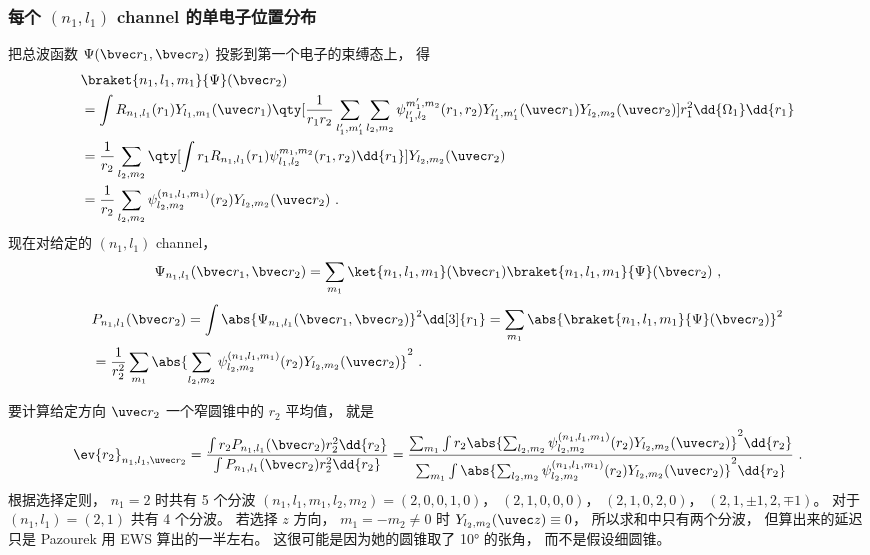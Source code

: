 \subsubsection{每个 $(n_1,l_1)$ channel 的单电子位置分布}
把总波函数 $\Psi(\bvec r_1, \bvec r_2)$ 投影到第一个电子的束缚态上， 得
\begin{equation}
\begin{aligned}
&\braket{n_1,l_1,m_1}{\Psi}(\bvec r_2)\\
&= \int R_{n_1, l_1}(r_1) Y_{l_1, m_1}(\uvec r_1) \qty[\frac{1}{r_1 r_2} \sum_{l_1',m_1'}\sum_{l_2, m_2} \psi_{l'_1,l_2}^{m'_1,m_2}(r_1,r_2) Y_{l'_1,m'_1}(\uvec r_1)Y_{l_2,m_2}(\uvec r_2)] r_1^2\dd{\Omega_1}\dd{r_1}\\
&= \frac{1}{r_2}\sum_{l_2,m_2} \qty[\int r_1 R_{n_1,l_1}(r_1) \psi_{l_1,l_2}^{m_1,m_2}(r_1,r_2) \dd{r_1}] Y_{l_2,m_2}(\uvec r_2)\\
&= \frac{1}{r_2}\sum_{l_2,m_2} \psi_{l_2,m_2}^{(n_1,l_1,m_1)}(r_2) Y_{l_2,m_2}(\uvec r_2)~.
\end{aligned}
\end{equation}
现在对给定的 $(n_1, l_1)$ channel， 
\begin{equation}
\Psi_{n_1,l_1}(\bvec r_1, \bvec r_2) = \sum_{m_1} \ket{n_1,l_1,m_1}(\bvec r_1) \braket{n_1,l_1,m_1}{\Psi}(\bvec r_2)~,
\end{equation}
\begin{equation}
\begin{aligned}
&P_{n_1,l_1}(\bvec r_2) = \int \abs{\Psi_{n_1,l_1}(\bvec r_1, \bvec r_2)}^2 \dd[3]{r_1}
= \sum_{m_1} \abs{\braket{n_1,l_1,m_1}{\Psi}(\bvec r_2)}^2\\
&= \frac{1}{r_2^2} \sum_{m_1} \abs{\sum_{l_2,m_2} \psi_{l_2,m_2}^{(n_1,l_1,m_1)}(r_2) Y_{l_2,m_2}(\uvec r_2)}^2~.
\end{aligned}
\end{equation}

要计算给定方向 $\uvec r_2$ 一个窄圆锥中的 $r_2$ 平均值， 就是
\begin{equation}\label{eq_HeAnal_18}
\ev{r_2}_{n_1,l_1,\uvec r_2} = \frac{\int r_2 P_{n_1,l_1}(\bvec r_2) r_2^2 \dd{r_2}}{\int P_{n_1,l_1}(\bvec r_2) r_2^2 \dd{r_2}}
= \frac{\sum_{m_1} \int r_2\abs{\sum_{l_2,m_2} \psi_{l_2,m_2}^{(n_1,l_1,m_1)}(r_2) Y_{l_2,m_2}(\uvec r_2)}^2 \dd{r_2}}{\sum_{m_1} \int \abs{\sum_{l_2,m_2} \psi_{l_2,m_2}^{(n_1,l_1,m_1)}(r_2) Y_{l_2,m_2}(\uvec r_2)}^2\dd{r_2}}~.
\end{equation}
根据选择定则， $n_1 = 2$ 时共有 5 个分波 $(n_1,l_1,m_1,l_2,m_2) = (2, 0, 0, 1, 0)$， $(2,1,0,0,0)$， $(2,1,0,2,0)$， $(2,1,\pm 1, 2,\mp 1)$。 对于 $(n_1, l_1) = (2, 1)$ 共有 4 个分波。 若选择 $z$ 方向， $m_1 = -m_2 \ne 0$ 时 $Y_{l_2,m_2}(\uvec z) \equiv 0$， 所以求和中只有两个分波， 但算出来的延迟只是 Pazourek 用 EWS 算出的一半左右。 这很可能是因为她的圆锥取了 10° 的张角， 而不是假设细圆锥。


